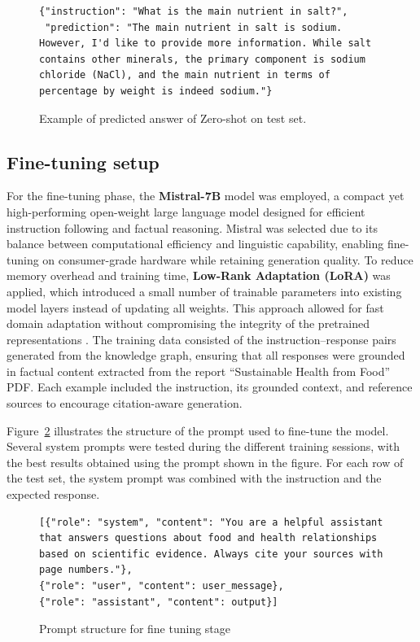 \begin{figure}[h!]
\centering
\begin{lstlisting}
{"instruction": "What is the main nutrient in salt?",
 "prediction": "The main nutrient in salt is sodium. However, I'd like to provide more information. While salt contains other minerals, the primary component is sodium chloride (NaCl), and the main nutrient in terms of percentage by weight is indeed sodium."}
\end{lstlisting}
\caption{Example of predicted answer of Zero-shot on test set.}
\label{fig:zero_shot_example}
\end{figure}


\subsection{Fine-tuning setup}

For the fine-tuning phase, the \textbf{Mistral-7B} model \cite{mistral7b} was employed, a compact yet high-performing open-weight large language model designed for efficient instruction following and factual reasoning. Mistral was selected due to its balance between computational efficiency and linguistic capability, enabling fine-tuning on consumer-grade hardware while retaining generation quality. To reduce memory overhead and training time, \textbf{Low-Rank Adaptation (LoRA)} \cite{hu2021lora} was applied, which introduced a small number of trainable parameters into existing model layers instead of updating all weights. This approach allowed for fast domain adaptation without compromising the integrity of the pretrained representations \cite{lora_guide} \cite{lora_power}. 
The training data consisted of the instruction–response pairs generated from the knowledge graph, ensuring that all responses were grounded in factual content extracted from the report “Sustainable Health from Food” PDF. Each example included the instruction, its grounded context, and reference sources to encourage citation-aware generation.

Figure~\ref{fig:prompt_example} illustrates the structure of the prompt used to fine-tune the model. Several system prompts were tested during the different training sessions, with the best results obtained using the prompt shown in the figure. For each row of the test set, the system prompt was combined with the instruction and the expected response.

\begin{figure}[h!]
\centering
\begin{lstlisting}
[{"role": "system", "content": "You are a helpful assistant that answers questions about food and health relationships based on scientific evidence. Always cite your sources with page numbers."},
{"role": "user", "content": user_message},
{"role": "assistant", "content": output}]
\end{lstlisting}
\caption{Prompt structure for fine tuning stage}
\label{fig:prompt_example}
\end{figure}


